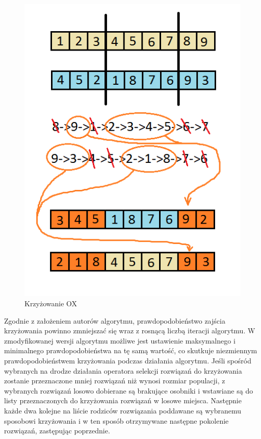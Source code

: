 \newpage
\begin{figure}[h]
\includegraphics[scale=1]{ox}
\caption{Krzyżowanie OX}
\end{figure}

Zgodnie z założeniem autorów algorytmu, prawdopodobieństwo zajścia krzyżowania powinno zmniejszać się wraz z rosnącą liczbą iteracji algorytmu. W zmodyfikowanej wersji algorytmu możliwe jest ustawienie maksymalnego i minimalnego prawdopodobieństwa na tę samą wartość, co skutkuje niezmiennym prawdopodobieństwem krzyżowania podczas działania algorytmu. Jeśli spośród wybranych na drodze działania operatora selekcji rozwiązań do krzyżowania zostanie przeznaczone mniej rozwiązań niż wynosi rozmiar populacji, z wybranych rozwiązań losowo dobierane są brakujące osobniki i wstawiane są do listy przeznaczonych do krzyżowania rozwiązań w losowe miejsca. Następnie każde dwa kolejne na liście rodziców rozwiązania poddawane są wybranemu sposobowi krzyżowania i w ten sposób otrzymywane następne pokolenie rozwiązań, zastępując poprzednie.

